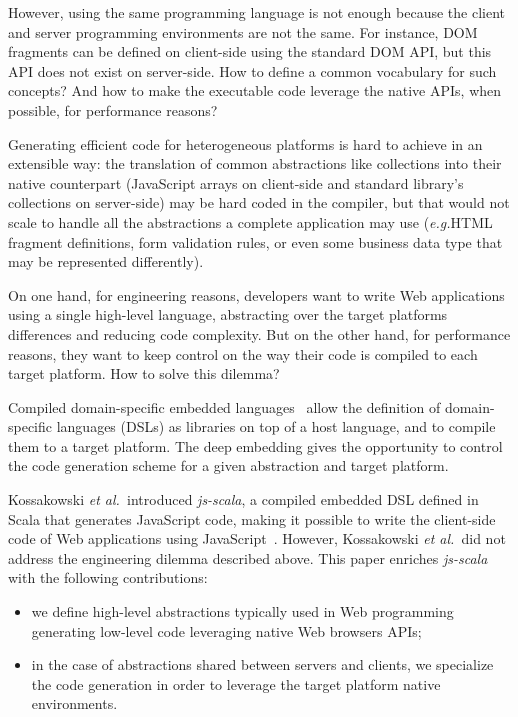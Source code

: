 \documentclass[preprint]{sigplanconf}
\newcommand{\eg}{\emph{e.g.}}
\newcommand{\etal}{\emph{et al.~}}
\begin{document}
However, using the same programming language is not enough because the client and server programming environments
are not the same. For instance, DOM fragments can be defined on client-side using the standard DOM API, but this
API does not exist on server-side. How to define a common vocabulary for such concepts? And how to make the
executable code leverage the native APIs, when possible, for performance reasons?

Generating efficient code for heterogeneous platforms is hard to achieve in an extensible way: the translation of
common abstractions like collections into their native counterpart (JavaScript arrays on client-side and standard
library's collections on server-side) may be hard coded in the compiler, but that would not scale to handle all the
abstractions a complete application may use (\eg HTML fragment definitions, form validation rules, or even some
business data type that may be represented differently).

On one hand, for engineering reasons, developers want to write Web applications using a single high-level language,
abstracting over the target platforms differences and reducing code complexity. But on the other hand, for
performance reasons, they want to keep control on the way their code is compiled to each target platform. How to
solve this dilemma?

Compiled domain-specific embedded languages~\cite{Elliott2003_Compiling} allow the definition of domain-specific
languages (DSLs) as libraries on top of a host language, and to compile them to a target platform. The deep embedding
gives the opportunity to control the code generation scheme for a given abstraction and target platform.

Kossakowski \etal introduced \emph{js-scala}, a compiled embedded DSL defined in Scala that generates JavaScript
code, making it possible to write the client-side code of Web applications using
JavaScript~\cite{Kossakowski12_JsDESL}. However, Kossakowski \etal did not address the engineering dilemma described
above. This paper enriches \emph{js-scala} with the following contributions:

\begin{itemize}
 \item we define high-level abstractions typically used in Web programming generating low-level code leveraging
native Web browsers APIs;
 \item in the case of abstractions shared between servers and clients, we specialize the code generation in order to
leverage the target platform native environments.
\end{itemize}
\end{document}
